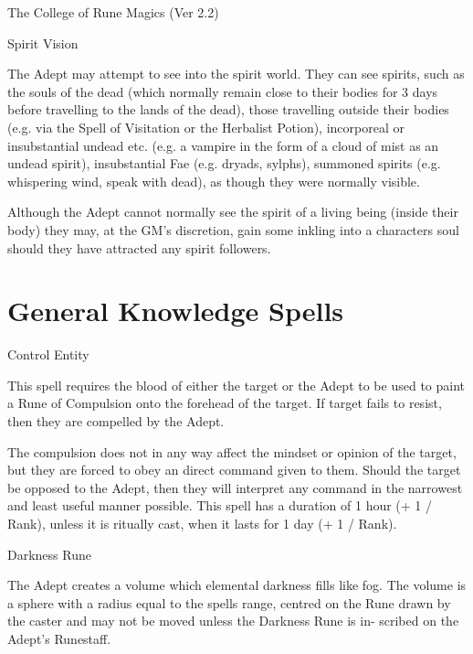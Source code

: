 \begin{Chapter}{The College of Rune Magics (Ver 2.2)}
\begin{talent}[T-2]{Spirit Vision}
\begin{effects}
The Adept may attempt to see into the spirit world. They can see
spirits, such as the souls of the dead (which normally remain close to
their bodies for 3 days before travelling to the lands of the dead),
those travelling outside their bodies (e.g.  via the Spell of
Visitation or the Herbalist Potion), incorporeal or insubstantial
undead etc.  (e.g.  a vampire in the form of a cloud of mist as an
undead spirit), insubstantial Fae (e.g. dryads, sylphs), summoned
spirits (e.g.  whispering wind, speak with dead), as though they were
normally visible.

Although the Adept cannot normally see the spirit of a living being
(inside their body) they may, at the GM’s discretion, gain some
inkling into a characters soul should they have attracted any spirit
followers.
\end{effects}
\end{talent}

\section{General Knowledge Spells}

\begin{spell}[G-1]{Control Entity}

\begin{effects}
This spell requires the blood of either the target or the Adept to be
used to paint a Rune of Compulsion onto the forehead of the target.
If target fails to resist, then they are compelled by the Adept.

The compulsion does not in any way affect the mindset or opinion of
the target, but they are forced to obey an direct command given to
them.  Should the target be opposed to the Adept, then they will
interpret any command in the narrowest and least useful manner
possible. This spell has a duration of 1 hour (+ 1 / Rank), unless it
is ritually cast, when it lasts for 1 day (+ 1 / Rank).
\end{effects}
\end{spell}

\begin{spell}[G-2]{Darkness Rune}

\begin{effects}
The Adept creates a volume which elemental darkness fills like fog.
The volume is a sphere with a radius equal to the spells range,
centred on the Rune drawn by the caster and may not be moved unless
the Darkness Rune is in- scribed on the Adept’s Runestaff.


\end{effects}
\end{spell}
\end{Chapter}
